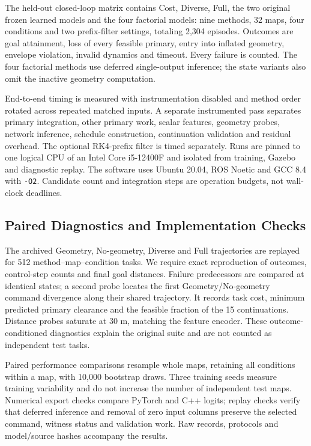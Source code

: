 \documentclass[journal]{IEEEtran}
\begin{document}
The held-out closed-loop matrix contains Cost, Diverse, Full, the two original frozen learned models and the four factorial models: nine methods, 32 maps, four conditions and two prefix-filter settings, totaling 2,304 episodes. Outcomes are goal attainment, loss of every feasible primary, entry into inflated geometry, envelope violation, invalid dynamics and timeout. Every failure is counted. The four factorial methods use deferred single-output inference; the state variants also omit the inactive geometry computation.

End-to-end timing is measured with instrumentation disabled and method order rotated across repeated matched inputs. A separate instrumented pass separates primary integration, other primary work, scalar features, geometry probes, network inference, schedule construction, continuation validation and residual overhead. The optional RK4-prefix filter is timed separately. Runs are pinned to one logical CPU of an Intel Core i5-12400F and isolated from training, Gazebo and diagnostic replay. The software uses Ubuntu 20.04, ROS Noetic and GCC 8.4 with \texttt{-O2}. Candidate count and integration steps are operation budgets, not wall-clock deadlines.

\subsection{Paired Diagnostics and Implementation Checks}
The archived Geometry, No-geometry, Diverse and Full trajectories are replayed for 512 method--map--condition tasks. We require exact reproduction of outcomes, control-step counts and final goal distances. Failure predecessors are compared at identical states; a second probe locates the first Geometry/No-geometry command divergence along their shared trajectory. It records task cost, minimum predicted primary clearance and the feasible fraction of the 15 continuations. Distance probes saturate at 30 m, matching the feature encoder. These outcome-conditioned diagnostics explain the original suite and are not counted as independent test tasks.

Paired performance comparisons resample whole maps, retaining all conditions within a map, with 10,000 bootstrap draws. Three training seeds measure training variability and do not increase the number of independent test maps. Numerical export checks compare PyTorch and C++ logits; replay checks verify that deferred inference and removal of zero input columns preserve the selected command, witness status and validation work. Raw records, protocols and model/source hashes accompany the results.
\end{document}

